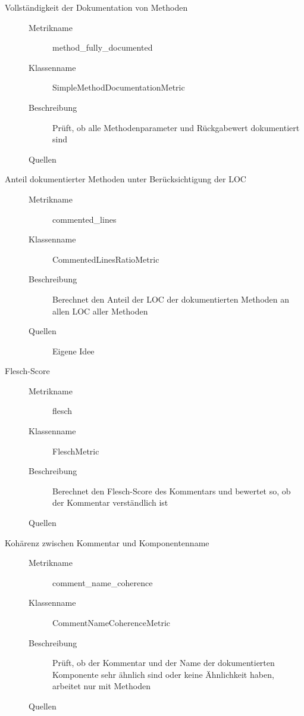 \begin{appendices}
\begin{description}
\item[Vollständigkeit der Dokumentation von Methoden]
\begin{description}
\item[]
    \item [Metrikname]  method\_fully\_documented
    \item [Klassenname] SimpleMethodDocumentationMetric
    \item[Beschreibung] Prüft, ob alle Methodenparameter und Rückgabewert dokumentiert sind
    \item[Quellen] \cite[S. 5]{HowDocumentationEvolvesoverTime}
\end{description}
\clearpage
\item[Anteil dokumentierter Methoden unter
Berücksichtigung der LOC]
\begin{description}
\item[]
    \item [Metrikname]  commented\_lines
    \item [Klassenname] CommentedLinesRatioMetric
    \item[Beschreibung]  Berechnet den Anteil der \ac{LOC} der dokumentierten Methoden an allen \ac{LOC} aller Methoden
    \item[Quellen] Eigene Idee
\end{description}

\item[Flesch-Score]
\begin{description}
\item[]
    \item [Metrikname]  flesch
    \item [Klassenname] FleschMetric
    \item[Beschreibung]   Berechnet den Flesch-Score des Kommentars und bewertet so, ob der Kommentar verständlich ist
    \item[Quellen] \cite[S. 72]{AutomaticQualityAssessmentofSourceCodeComments:TheJavadocMiner}
\end{description}

\item[Kohärenz zwischen Kommentar und
Komponentenname]
\begin{description}
\item[]
    \item [Metrikname]  comment\_name\_coherence
    \item [Klassenname] CommentNameCoherenceMetric
    \item[Beschreibung]  Prüft, ob der Kommentar und der Name der dokumentierten Komponente sehr ähnlich sind oder keine Ähnlichkeit haben, arbeitet nur mit Methoden
    \item[Quellen] \cite[S. 86ff ]{Qualityanalysisofsourcecodecomments}
\end{description}


\end{description}
\end{appendices}

